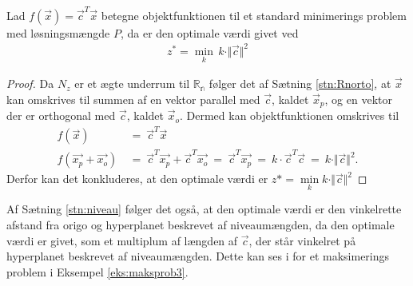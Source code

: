 \begin{stn}
Lad $f(\vec{x})=\vec{c}^T\vec{x}$ betegne objektfunktionen til et standard minimerings problem med løsningsmængde $P$, da er den 
optimale værdi givet ved
\begin{align*}
z^* = \underset{k}{\min} \, k \cdot \Vert \vec{c} \Vert ^2
\end{align*}
\label{stn:niveau}
\end{stn}
\begin{proof}
Da $N_z$ er et ægte underrum til $\mathds{R_n}$ følger det af Sætning \ref{stn:Rnorto}, at $\vec{x}$ kan omskrives til summen af en vektor parallel med $\vec{c}$, kaldet $\vec{x}_p$, og en vektor der er orthogonal med $\vec{c}$, kaldet $\vec{x}_o$. 
Dermed kan objektfunktionen omskrives til
\begin{align*}
	f(\vec{x}) & \ = \ \vec{c}^T\vec{x}\\
	f(\vec{x_p}+\vec{x_o}) & \ = \ 
	\vec{c}^T\vec{x_p}+\vec{c}^T\vec{x_o} \ = \ 
	\vec{c}^T\vec{x_p} \ = \ 
	k\cdot \vec{c}^T\vec{c} \ = \ 
	k \cdot \Vert \vec{c} \Vert ^2.
\end{align*}
Derfor kan det konkluderes, at den optimale værdi er $z* = \underset{k}{\min}k \cdot \Vert \vec{c} \Vert ^2$
\end{proof}
Af Sætning \ref{stn:niveau} følger det også, at den optimale værdi er den vinkelrette afstand fra origo og  hyperplanet beskrevet  af niveaumængden, da den optimale værdi er givet, som et multiplum af længden af $\vec{c}$, der står vinkelret på hyperplanet beskrevet  af niveaumængden.
Dette kan ses i  for et maksimerings problem i Eksempel \ref{eks:maksprob3}.


